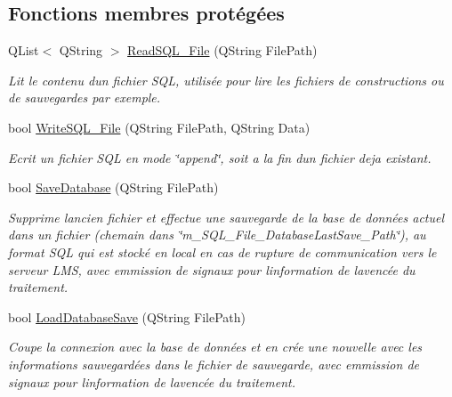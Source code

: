 \subsection*{Fonctions membres protégées}
\begin{DoxyCompactItemize}
\item 
Q\+List$<$ Q\+String $>$ \hyperlink{class_c_s_q_lite___local___d_b_aa0750076670f4b4b4aa9eb0a925aaebb}{Read\+S\+Q\+L\+\_\+\+File} (Q\+String File\+Path)
\begin{DoxyCompactList}\small\item\em Lit le contenu d\textquotesingle{}un fichier S\+Q\+L, utilisée pour lire les fichiers de constructions ou de sauvegardes par exemple. \end{DoxyCompactList}\item 
bool \hyperlink{class_c_s_q_lite___local___d_b_acdb2940a30f654f0c39cd0c259b9ad17}{Write\+S\+Q\+L\+\_\+\+File} (Q\+String File\+Path, Q\+String Data)
\begin{DoxyCompactList}\small\item\em Ecrit un fichier S\+Q\+L en mode \char`\"{}append\char`\"{}, soit a la fin d\textquotesingle{}un fichier deja existant. \end{DoxyCompactList}\item 
bool \hyperlink{class_c_s_q_lite___local___d_b_a8d0221163f980dbec609d06d1666efa6}{Save\+Database} (Q\+String File\+Path)
\begin{DoxyCompactList}\small\item\em Supprime l\textquotesingle{}ancien fichier et effectue une sauvegarde de la base de données actuel dans un fichier (chemain dans \char`\"{}m\+\_\+\+S\+Q\+L\+\_\+\+File\+\_\+\+Database\+Last\+Save\+\_\+\+Path\char`\"{}), au format S\+Q\+L qui est stocké en local en cas de rupture de communication vers le serveur L\+M\+S, avec emmission de signaux pour l\textquotesingle{}information de l\textquotesingle{}avencée du traitement. \end{DoxyCompactList}\item 
bool \hyperlink{class_c_s_q_lite___local___d_b_ae0acaed46f00a2e0354dd5b2bd5b684a}{Load\+Database\+Save} (Q\+String File\+Path)
\begin{DoxyCompactList}\small\item\em Coupe la connexion avec la base de données et en crée une nouvelle avec les informations sauvegardées dans le fichier de sauvegarde, avec emmission de signaux pour l\textquotesingle{}information de l\textquotesingle{}avencée du traitement. \end{DoxyCompactList}\item 

\end{DoxyCompactItemize}
